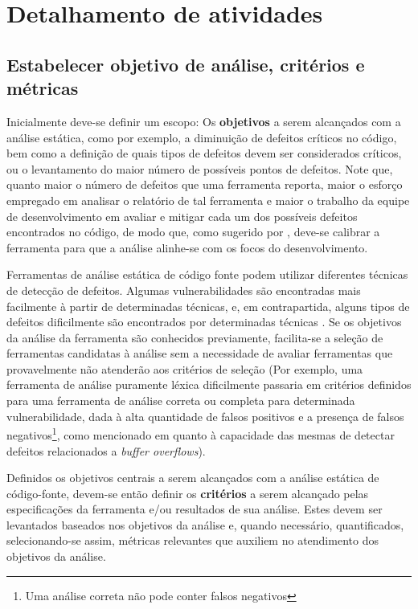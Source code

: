 \section{Detalhamento de atividades}\label{metodologia_proposta:detalhamento_de_atividades}

\subsection{Estabelecer objetivo de análise, critérios e métricas}

Inicialmente deve-se definir um escopo: Os \textbf{objetivos} a serem alcançados com a análise estática, como por exemplo, a diminuição de defeitos críticos no código, bem como a definição de quais tipos de defeitos devem ser considerados críticos, ou o levantamento do maior número de possíveis pontos de defeitos. Note que, quanto maior o número de defeitos que uma ferramenta reporta, maior o esforço empregado em analisar o relatório de tal ferramenta e maior o trabalho da equipe de desenvolvimento em avaliar e mitigar cada um dos possíveis defeitos encontrados no código, de modo que, como sugerido por \cite{seatbelts}, deve-se calibrar a ferramenta para que a análise alinhe-se com os focos do desenvolvimento.

Ferramentas de análise estática de código fonte podem utilizar diferentes técnicas de detecção de defeitos. Algumas vulnerabilidades são encontradas mais facilmente à partir de determinadas técnicas, e, em contrapartida, alguns tipos de defeitos dificilmente são encontrados por determinadas técnicas \cite{harvard}. Se os objetivos da análise da ferramenta são conhecidos previamente, facilita-se a seleção de ferramentas candidatas à análise sem a necessidade de avaliar ferramentas que provavelmente não atenderão aos critérios de seleção (Por exemplo, uma ferramenta de análise puramente léxica dificilmente passaria em critérios definidos para uma ferramenta de análise correta ou completa para determinada vulnerabilidade, dada à alta quantidade de falsos positivos e a presença de falsos negativos\footnote{Uma análise correta não pode conter falsos negativos}, como mencionado em \cite{harvard} quanto à capacidade das mesmas de detectar defeitos relacionados a \textit{buffer overflows}).

Definidos os objetivos centrais a serem alcançados com a análise estática de código-fonte, devem-se então definir os \textbf{critérios} a serem alcançado pelas especificações da ferramenta e/ou resultados de sua análise. Estes devem ser levantados baseados nos objetivos da análise e, quando necessário, quantificados, selecionando-se assim, métricas relevantes que auxiliem no atendimento dos objetivos da análise.


